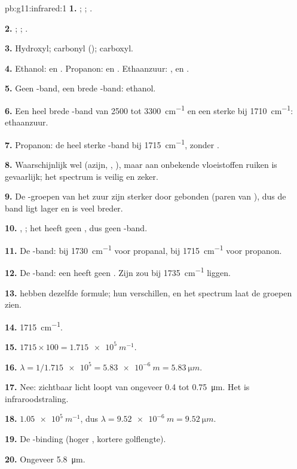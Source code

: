 \begin{solution}{pb:g11:infrared:1}
\textbf{1.} ; ; .

\textbf{2.} ; ; .

\textbf{3.} Hydroxyl; carbonyl (); carboxyl.

\textbf{4.} Ethanol:  en . Propanon:  en
. Ethaanzuur: ,  en .

\textbf{5.} Geen -band, een brede -band: ethanol.

\textbf{6.} Een heel brede -band van 2500 tot \qty{3300}{cm^{-1}}
en een sterke  bij \qty{1710}{cm^{-1}}: ethaanzuur.

\textbf{7.} Propanon: de heel sterke -band bij
\qty{1715}{cm^{-1}}, zonder .

\textbf{8.} Waarschijnlijk wel (azijn, , ), maar aan
onbekende vloeistoffen ruiken is gevaarlijk; het spectrum is veilig en
zeker.

\textbf{9.} De -groepen van het zuur zijn sterker door
 gebonden (paren van ), dus de band ligt lager
en is veel breder.

\textbf{10.} , ; het heeft geen , dus geen
-band.

\textbf{11.} De -band: bij \qty{1730}{cm^{-1}} voor propanal,
bij \qty{1715}{cm^{-1}} voor propanon.

\textbf{12.} De -band: een  heeft geen . Zijn
 zou bij \qty{1735}{cm^{-1}} liggen.

\textbf{13.}  hebben dezelfde formule; hun 
verschillen, en het spectrum laat de groepen zien.

\textbf{14.} \qty{1715}{cm^{-1}}.

\textbf{15.} $1715 \times 100 = \qty{1.715e5}{m^{-1}}$.

\textbf{16.} $\lambda = 1/\num{1.715e5} = \qty{5.83e-6}{m} =
\qty{5.83}{\micro m}$.

\textbf{17.} Nee: zichtbaar licht loopt van ongeveer 0.4 tot
\qty{0.75}{\micro m}. Het is infraroodstraling.

\textbf{18.} $\num{1.05e5}\ \si{m^{-1}}$, dus $\lambda = \qty{9.52e-6}{m}
= \qty{9.52}{\micro m}$.

\textbf{19.} De -binding (hoger , kortere golflengte).

\textbf{20.} Ongeveer \qty{5.8}{\micro m}.
\end{solution}
